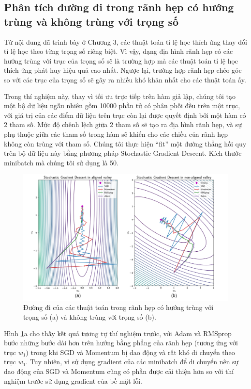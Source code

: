 \subsection{Phân tích đường đi trong rãnh hẹp có hướng trùng và không trùng với trọng số}

Từ nội dung đã trình bày ở Chương 3, các thuật toán tỉ lệ học thích ứng thay đổi tỉ lệ học theo từng trọng số riêng biệt. Vì vậy, dạng địa hình rãnh hẹp có các hướng trùng với trục của trọng số sẽ là trường hợp mà các thuật toán tỉ lệ học thích ứng phát huy hiệu quả cao nhất. Ngược lại, trường hợp rãnh hẹp chéo góc so với các trục của trọng số sẽ gây ra nhiều khó khăn nhất cho các thuật toán ấy.

Trong thí nghiệm này, thay vì tối ưu trực tiếp trên hàm giả lập, chúng tôi tạo một bộ dữ liệu ngẫu nhiên gồm 10000 phần tử có phân phối đều trên một trục, với giá trị của các điểm dữ liệu trên trục còn lại được quyết định bởi một hàm có 2 tham số. Mức độ chênh lệch giữa 2 tham số sẽ tạo ra địa hình rãnh hẹp, và sự phụ thuộc giữa các tham số trong hàm sẽ khiến cho các chiều của rãnh hẹp không còn trùng với tham số. Chúng tôi thực hiện ``fit'' một đường thẳng hồi quy trên bộ dữ liệu này bằng phương pháp Stochastic Gradient Descent. Kích thước minibatch mà chúng tôi sử dụng là 50.

\begin{figure}[htp]
	\centering
	\includegraphics[width=140 mm]{images/aligned-nonaligned.png}
	\caption{Đường đi của các thuật toán trong rãnh hẹp có hướng trùng với trọng số (a) và không trùng với trọng số (b).}
	\label{fig:aligned-nonaligned}
\end{figure}

Hình \ref{fig:aligned-nonaligned}a cho thấy kết quả tương tự thí nghiệm trước, với Adam và RMSprop bước những bước dài hơn trên hướng bằng phẳng của rãnh hẹp (tương ứng với trục $w_1$) trong khi SGD và Momentum bị dao động và rất khó di chuyển theo trục $w_1$. Tuy nhiên, vì sử dụng gradient của các minibatch để di chuyển nên sự dao động của SGD và Momentum cũng có phần được cải thiện hơn so với thí nghiệm trước sử dụng gradient của bề mặt lỗi.

